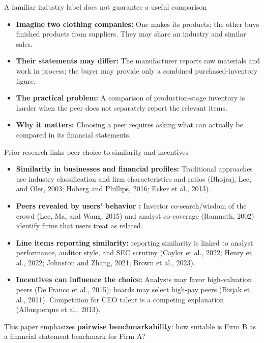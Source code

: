 \documentclass[10pt,aspectratio=169]{beamer}
\newcommand{\hi}[1]{{\color{Teal}\textbf{#1}}}
\newenvironment{bullets}{\begin{itemize}\setlength{\itemsep}{7pt}}{\end{itemize}}
\begin{document}
\begin{frame}{A familiar industry label does not guarantee a useful comparison}
\begin{bullets}
\item \textbf{Imagine two clothing companies:} One makes its products; the other buys finished products from suppliers. They may share an industry and similar sales.
\item \textbf{Their statements may differ:} The manufacturer reports raw materials and work in process; the buyer may provide only a combined purchased-inventory figure.
\item \textbf{The practical problem:} A comparison of production-stage inventory is harder when the peer does not separately report the relevant items.
\item \textbf{Why it matters:} Choosing a peer requires asking what can actually be compared in its financial statements.
\end{bullets}
\end{frame}




\begin{frame}{Prior research links peer choice to similarity and incentives}
\begin{bullets}
\item \textbf{Similarity in businesses and financial profiles:} Traditional approaches use industry classification and firm characteristics and ratios (Bhojraj, Lee, and Oler, 2003; Hoberg and Phillips, 2016; Ecker et al., 2013). 
\item \textbf{Peers revealed by users' behavior :} Investor co-search/wisdom of the crowd (Lee, Ma, and Wang, 2015) and analyst co-coverage (Ramnath, 2002) identify firms that users treat as related.
\item \textbf{Line items reporting similarity:} reporting similarity is linked to analyst performance, auditor style, and SEC scrutiny (Caylor et al., 2022; Henry et al., 2022; Johnston and Zhang, 2021; Brown et al., 2023).
\item \textbf{Incentives can influence the choice:} Analysts may favor high-valuation peers (De Franco et al., 2015); boards may select high-pay peers (Bizjak et al., 2011). Competition for CEO talent is a competing explanation (Albuquerque et al., 2013).
\end{bullets}
This paper emphasizes \hi{pairwise benchmarkability}: how suitable is Firm B as a financial statement benchmark for Firm A?
\end{frame}
\end{document}
